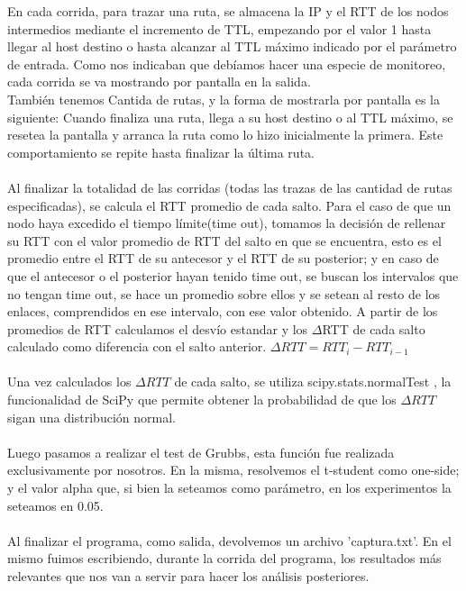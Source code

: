 En cada corrida, para trazar una ruta, se almacena la IP y el RTT de los nodos intermedios mediante el incremento de TTL, empezando por el valor 1 hasta llegar al host destino o hasta alcanzar al TTL máximo indicado por el parámetro de entrada. Como nos indicaban que deb\'iamos hacer una especie de monitoreo, cada corrida se va mostrando por pantalla en la salida.\\
Tambi\'en tenemos Cantida de rutas, y la forma de mostrarla por pantalla es la siguiente: Cuando finaliza una ruta, llega a su host destino o al TTL m\'aximo, se resetea la pantalla y arranca la ruta como lo hizo inicialmente la primera. Este comportamiento se repite hasta finalizar la \'ultima ruta.
\\
\\
Al finalizar la totalidad de las corridas (todas las trazas de las cantidad de rutas especificadas), se calcula el RTT promedio de cada salto. Para el caso de que un nodo haya excedido el tiempo límite(time out), tomamos la decisión de rellenar su RTT con el valor promedio de RTT del salto en que se encuentra, esto es el promedio entre el RTT de su antecesor y el RTT de su posterior; y en caso de que el antecesor o el posterior hayan tenido time out, se buscan los intervalos que no tengan time out, se hace un promedio sobre ellos y se setean al resto de los enlaces, comprendidos en ese intervalo, con ese valor obtenido. A partir de los promedios de RTT calculamos el desvío estandar y los $\Delta$RTT de cada salto calculado como diferencia con el salto anterior.
$\Delta RTT = RTT_{i} - RTT _{i-1}$
\\
\\
Una vez calculados los $\Delta RTT$ de cada salto, se utiliza scipy.stats.normalTest , la funcionalidad de SciPy que permite obtener la probabilidad de que los $\Delta RTT$ sigan una distribución normal.
\\
\\
Luego pasamos a realizar el test de Grubbs, esta funci\'on fue realizada exclusivamente por nosotros. En la misma, resolvemos el t-student como one-side; y el valor alpha que, si bien la seteamos como par\'ametro, en los experimentos la seteamos en 0.05.
\\
\\
Al finalizar el programa, como salida, devolvemos un archivo 'captura.txt'. En el mismo fuimos escribiendo, durante la corrida del programa, los resultados m\'as relevantes que nos van a servir para hacer los an\'alisis posteriores.


